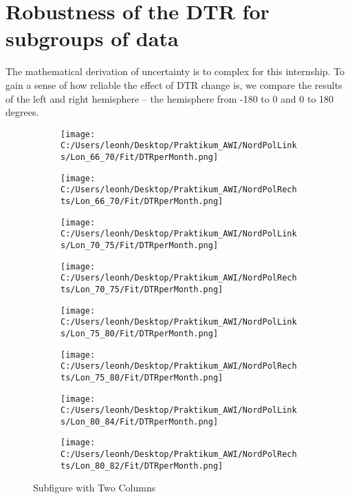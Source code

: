 \section[Robustness]{Robustness of the DTR for subgroups of data}

The mathematical derivation of uncertainty is to complex for this internship.
To gain a sense of how reliable the effect of DTR change is, we compare the 
results of the left and right hemisphere -- the hemisphere from -180 to 0 and 0 to 180 degrees. 

\begin{figure}[ht]
    \centering
    \begin{subfigure}{0.48\textwidth}
        \centering
        \texttt{[image: C:/Users/leonh/Desktop/Praktikum\_AWI/NordPolLinks/Lon\_66\_70/Fit/DTRperMonth.png]}
    \end{subfigure}%
    \begin{subfigure}{0.48\textwidth}
        \centering
        \texttt{[image: C:/Users/leonh/Desktop/Praktikum\_AWI/NordPolRechts/Lon\_66\_70/Fit/DTRperMonth.png]}
    
    \end{subfigure}

    \begin{subfigure}{0.48\textwidth}
        \centering
        \texttt{[image: C:/Users/leonh/Desktop/Praktikum\_AWI/NordPolLinks/Lon\_70\_75/Fit/DTRperMonth.png]}
    \end{subfigure}%
    \begin{subfigure}{0.48\textwidth}
        \centering
        \texttt{[image: C:/Users/leonh/Desktop/Praktikum\_AWI/NordPolRechts/Lon\_70\_75/Fit/DTRperMonth.png]}
    \end{subfigure}

    \begin{subfigure}{0.48\textwidth}
        \centering
        \texttt{[image: C:/Users/leonh/Desktop/Praktikum\_AWI/NordPolLinks/Lon\_75\_80/Fit/DTRperMonth.png]}
    \end{subfigure}%
    \begin{subfigure}{0.48\textwidth}
        \centering
        \texttt{[image: C:/Users/leonh/Desktop/Praktikum\_AWI/NordPolRechts/Lon\_75\_80/Fit/DTRperMonth.png]}
    \end{subfigure}
    
    \begin{subfigure}{0.48\textwidth}
        \centering
        \texttt{[image: C:/Users/leonh/Desktop/Praktikum\_AWI/NordPolLinks/Lon\_80\_84/Fit/DTRperMonth.png]}
    \end{subfigure}%
    \begin{subfigure}{0.48\textwidth}
        \centering
        \texttt{[image: C:/Users/leonh/Desktop/Praktikum\_AWI/NordPolRechts/Lon\_80\_82/Fit/DTRperMonth.png]}
    \end{subfigure}

    \caption{Subfigure with Two Columns}
    \label{fig:DTRleftright}
\end{figure}

